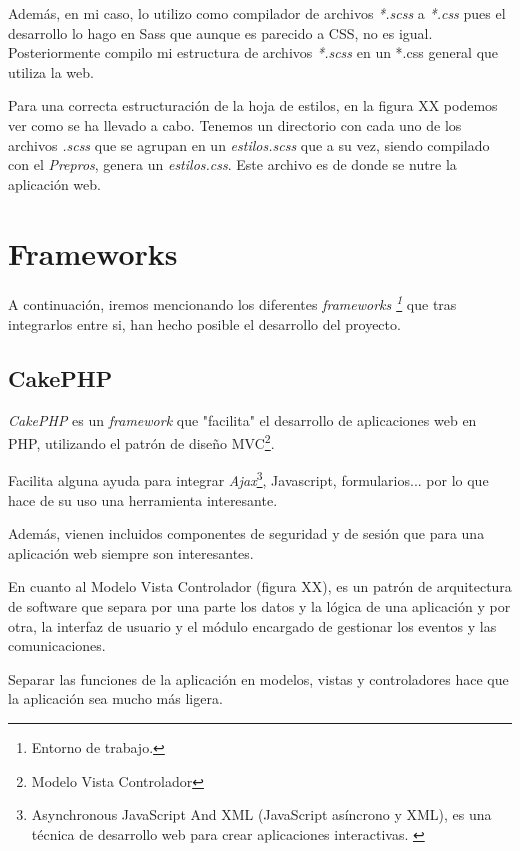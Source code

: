 Además, en mi caso, lo utilizo como compilador de archivos \textit{*.scss} a \textit{*.css} pues el desarrollo lo hago en Sass que aunque es parecido a CSS, no es igual. Posteriormente compilo mi estructura de archivos \textit{*.scss} en un *.css general que utiliza la web.

Para una correcta estructuración de la hoja de estilos, en la figura XX podemos ver como se ha llevado a cabo.
Tenemos un directorio con cada uno de los archivos \textit{.scss} que se agrupan en un \textit{estilos.scss} que a su vez, siendo compilado con el \textit{Prepros}, genera un \textit{estilos.css}. Este archivo es de donde se nutre la aplicación web.


\newpage

\section{Frameworks }

A continuación, iremos mencionando los diferentes \textit{frameworks \footnote{Entorno de trabajo.}} que tras integrarlos entre si, han hecho posible el desarrollo del proyecto.

\subsection{CakePHP}

\textit{CakePHP}\cite{web:cakephp} es un \textit{framework} que "facilita" el desarrollo de aplicaciones web en PHP, utilizando el patrón de diseño MVC\footnote{Modelo Vista Controlador}. \cite{wiki:cakephp}

Facilita alguna ayuda para integrar \textit{Ajax}\footnote{Asynchronous JavaScript And XML (JavaScript asíncrono y XML), es una técnica de desarrollo web para crear aplicaciones interactivas. \cite{wiki:ajax}}, Javascript, formularios... por lo que hace de su uso una herramienta interesante.

Además, vienen incluidos componentes de seguridad y de sesión que para una aplicación web siempre son interesantes.

En cuanto al Modelo Vista Controlador (figura XX), es un patrón de arquitectura de software que separa por una parte los datos y la lógica de una aplicación y por otra, la interfaz de usuario y el módulo encargado de gestionar los eventos y las comunicaciones. 

Separar las funciones de la aplicación en modelos, vistas y controladores hace que la aplicación sea mucho más ligera.

